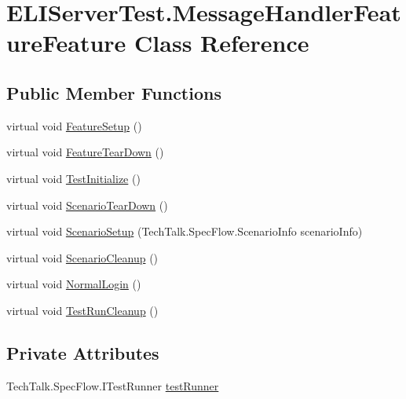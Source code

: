 \hypertarget{class_e_l_i_server_test_1_1_message_handler_feature_feature}{}\section{E\+L\+I\+Server\+Test.\+Message\+Handler\+Feature\+Feature Class Reference}
\label{class_e_l_i_server_test_1_1_message_handler_feature_feature}
\subsection*{Public Member Functions}
\begin{DoxyCompactItemize}
\item 
virtual void \hyperlink{class_e_l_i_server_test_1_1_message_handler_feature_feature_a272e8ed9689f837f07eb39e70e4b0378}{Feature\+Setup} ()
\item 
virtual void \hyperlink{class_e_l_i_server_test_1_1_message_handler_feature_feature_a8ceac2e29b7d70d0eb563bcdda087118}{Feature\+Tear\+Down} ()
\item 
virtual void \hyperlink{class_e_l_i_server_test_1_1_message_handler_feature_feature_aba7b5dffbc0c6bbd49940cc7678eb9d4}{Test\+Initialize} ()
\item 
virtual void \hyperlink{class_e_l_i_server_test_1_1_message_handler_feature_feature_a936db267d14b3d2b22a59265e0e87751}{Scenario\+Tear\+Down} ()
\item 
virtual void \hyperlink{class_e_l_i_server_test_1_1_message_handler_feature_feature_a6e9fc3f6ea6fa2fc9407b7714be281a6}{Scenario\+Setup} (Tech\+Talk.\+Spec\+Flow.\+Scenario\+Info scenario\+Info)
\item 
virtual void \hyperlink{class_e_l_i_server_test_1_1_message_handler_feature_feature_a81e0ddde598ff7247f9b42047885a30e}{Scenario\+Cleanup} ()
\item 
virtual void \hyperlink{class_e_l_i_server_test_1_1_message_handler_feature_feature_aa24302d97b99f950d50d442f644120f1}{Normal\+Login} ()
\item 
virtual void \hyperlink{class_e_l_i_server_test_1_1_message_handler_feature_feature_abc4f9ab13dc71beb97793101bfad439b}{Test\+Run\+Cleanup} ()
\end{DoxyCompactItemize}
\subsection*{Private Attributes}
\begin{DoxyCompactItemize}
\item 
Tech\+Talk.\+Spec\+Flow.\+I\+Test\+Runner \hyperlink{class_e_l_i_server_test_1_1_message_handler_feature_feature_a44767e763fb63366241c69133ede800f}{test\+Runner}
\end{DoxyCompactItemize}


